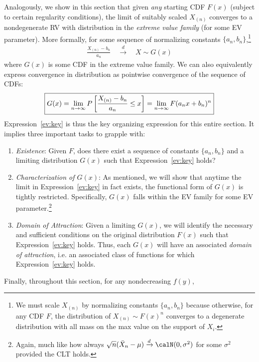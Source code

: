 \documentclass[12pt]{article}
\theoremstyle{plain}
\theoremstyle{definition}
\theoremstyle{remark}
\newcommand{\ra}{\rightarrow}
\newcommand{\dto}{\xrightarrow{d}}
\begin{document}
Analogously, we show in this section that given \emph{any} starting
CDF $F(x)$ (subject to certain regularity conditions), the limit of
suitably scaled $X_{(n)}$ converges to a nondegenerate RV with
distribution in the \emph{extreme value family} (for some EV
parameter).
More formally, for some sequence of normalizing constants
$\{a_n,b_n\}$,\footnote{%
  We must scale $X_{(n)}$ by normalizing constants $\{a_n,b_n\}$
  because otherwise, for any CDF $F$, the distribution of
  $X_{(n)}\sim F(x)^n$ converges to a degenerate distribution with
  all mass on the max value on the support of $X_i$.
}
\begin{align}
  \frac{X_{(n)}-b_n}{a_n}
  \quad
  \dto
  \quad
  X\sim G(x)
\end{align}
where $G(x)$ is some CDF in the extreme value family.
We can also equivalently express convergence in distribution as
pointwise convergence of the sequence of CDFs:
\begin{align}
  \boxed{%
  G(x)
  =\lim_{n\ra\infty}P\left[\frac{X_{(n)}-b_n}{a_n} \leq x\right]
  =\lim_{n\ra\infty}F(a_nx+b_n)^n
  }
  \label{ev:key}
\end{align}
Expression~\ref{ev:key} is thus the key organizing expression for
this entire section. It implies three important tasks to grapple
with:
\begin{enumerate}
  \item \emph{Existence}:
    Given $F$, does there exist a sequence of constants
    $\{a_n,b_n\}$ and a limiting distribution $G(x)$ such that
    Expression~\ref{ev:key} holds?
  \item \emph{Characterization of $G(x)$}:
    As mentioned, we will show that anytime the limit in
    Expression~\ref{ev:key} in fact exists, the functional form of
    $G(x)$ is tightly restricted.
    Specifically, $G(x)$ falls within the EV family for some EV
    parameter.\footnote{%
      Again, much like how always
      $\sqrt{n}(\bar{X}_n-\mu)\dto\calN(0,\sigma^2)$
      for some $\sigma^2$ provided the CLT holds.
    }
  \item
    \emph{Domain of Attraction}:
    Given a limiting $G(x)$, we will identify the necessary and
    sufficient conditions on the original distribution $F(x)$ such
    that Expression~\ref{ev:key} holds.
    Thus, each $G(x)$ will have an associated
    \emph{domain of attraction}, i.e. an associated class of functions
    for which Expression~\ref{ev:key} holds.
\end{enumerate}
Finally, throughout this section, for any nondecreasing $f(y)$,
\end{document}
